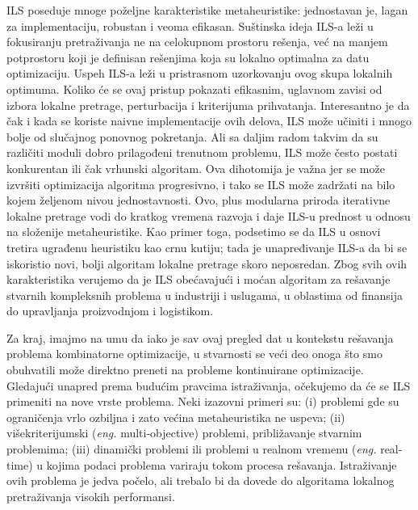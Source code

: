 \documentclass[a4paper]{article}
\newcommand{\eng}[1]{(\textit{eng.} #1)}
\begin{document}
ILS poseduje mnoge poželjne karakteristike metaheuristike: jednostavan je, lagan za implementaciju, robustan i veoma efikasan. Suštinska ideja ILS-a leži u fokusiranju pretraživanja ne na celokupnom prostoru rešenja, već na manjem potprostoru koji je definisan rešenjima koja su lokalno optimalna za datu optimizaciju. Uspeh ILS-a leži u pristrasnom uzorkovanju ovog skupa lokalnih optimuma. Koliko će se ovaj pristup pokazati efikasnim, uglavnom zavisi od izbora lokalne pretrage, perturbacija i kriterijuma prihvatanja. Interesantno je da čak i kada se koriste naivne implementacije ovih delova, ILS može učiniti i mnogo bolje od slučajnog ponovnog pokretanja. Ali sa daljim radom takvim da su različiti moduli dobro prilagođeni trenutnom problemu, ILS može često postati konkurentan ili čak vrhunski algoritam. Ova dihotomija je važna jer se može izvršiti optimizacija algoritma progresivno, i tako se ILS može zadržati na bilo kojem željenom nivou jednostavnosti. Ovo, plus modularna priroda iterativne lokalne pretrage vodi do kratkog vremena razvoja i daje ILS-u prednost u odnosu na složenije metaheuristike. Kao primer toga, podsetimo se da ILS u osnovi tretira ugrađenu heuristiku kao crnu kutiju; tada je unapređivanje ILS-a da bi se iskoristio novi, bolji algoritam lokalne pretrage skoro neposredan. Zbog svih ovih karakteristika verujemo da je ILS obećavajući i moćan algoritam za rešavanje stvarnih kompleksnih problema u industriji i uslugama, u oblastima od finansija do upravljanja proizvodnjom i logistikom.

Za kraj, imajmo na umu da iako je sav ovaj pregled dat u kontekstu rešavanja problema kombinatorne optimizacije, u stvarnosti se veći deo onoga što smo obuhvatili može direktno preneti na probleme kontinuirane optimizacije. Gledajući unapred prema budućim pravcima istraživanja, očekujemo da će se ILS primeniti na nove vrste problema. Neki izazovni primeri su: (i) problemi gde su ograničenja vrlo ozbiljna i zato većina metaheuristika ne uspeva; (ii) višekriterijumski \eng{multi-objective} problemi, približavanje stvarnim problemima; (iii) dinamički problemi ili problemi u realnom vremenu \eng{real-time} u kojima podaci problema variraju tokom procesa rešavanja.
Istraživanje ovih problema je jedva počelo, ali trebalo bi da dovede do algoritama lokalnog pretraživanja visokih performansi.

\clearpage 


\appendix
 

\end{document}
